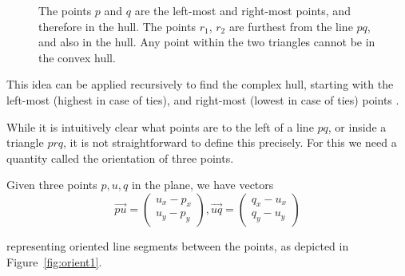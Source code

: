 \begin{figure}[ht]
{
    }
    \caption{The points $p$ and $q$ are the left-most and 
             right-most points, and therefore in the hull. The points $r_1$,
             $r_2$ are furthest from the line $pq$, and also in the hull. Any
             point within the two triangles cannot be in the convex hull.}
    \label{fig:quickhull}
\end{figure}

This idea can be applied recursively to find the complex hull, starting with
the left-most (highest in case of ties), and right-most (lowest in case of ties)
points \cite{Barber96}.

While it is intuitively clear what points are to the left of a line $pq$, or
inside a triangle $prq$, it is not straightforward to define this precisely.
For this we need a quantity called the orientation of three points.

Given three points $p, u, q$ in the plane, we have vectors
\[
    \vec{pu} = \begin{pmatrix}
        u_x - p_x \\
        u_y - p_y
    \end{pmatrix},
    \vec{uq} = \begin{pmatrix}
        q_x - u_x \\
        q_y - u_y
    \end{pmatrix}
\]

representing oriented line segments between the points, as depicted in
Figure~\ref{fig:orient1}.

